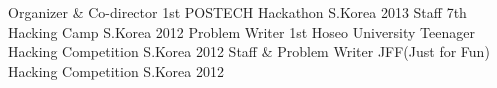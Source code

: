 \begin{cvhonors}
  \cvhonor
    {Organizer \& Co-director}
    {1st POSTECH Hackathon}
    {S.Korea}
    {2013}
  \cvhonor
    {Staff}
    {7th Hacking Camp}
    {S.Korea}
    {2012}
  \cvhonor
    {Problem Writer}
    {1st Hoseo University Teenager Hacking Competition}
    {S.Korea}
    {2012}
  \cvhonor
    {Staff \& Problem Writer}
    {JFF(Just for Fun) Hacking Competition}
    {S.Korea}
    {2012}
\end{cvhonors}
